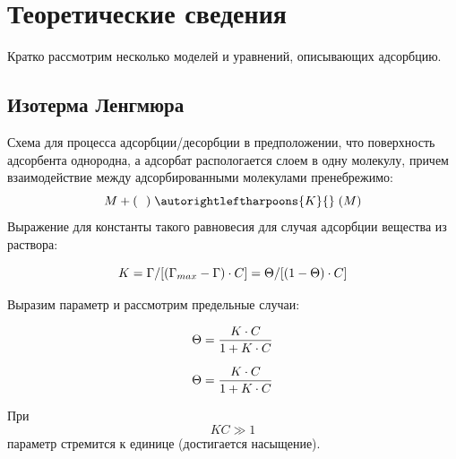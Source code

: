 \documentclass[a4paper]{article}
\begin{document}
	\section{\LARGE \textbf{Теоретические сведения}}
Кратко рассмотрим несколько моделей и уравнений, описывающих адсорбцию. \par
\subsection{\large{Изотерма Ленгмюра}} \par
Схема для процесса адсорбции/десорбции в предположении, что поверхность адсорбента однородна, а адсорбат распологается слоем в одну молекулу, причем взаимодействие между адсорбированными молекулами пренебрежимо:
\LARGE \[ M + (\ \ ) \;\autorightleftharpoons{K}{}\; (M)\]
\large Выражение для константы такого равновесия для случая адсорбции вещества из раствора: \par \vspace{0.3 cm}

\begin{center}
\[

\LARGE K = \Gamma /[(\Gamma_{max} - \Gamma) \cdot C] = \Theta / [(1 - \Theta) \cdot C]


\]
\end{center}

\par 
\vspace{0.3 cm}

Выразим параметр и рассмотрим предельные случаи:

\par 
\vspace{0.3 cm}

\begin{center}
\[

\LARGE \Theta = \frac{K \cdot C}{1 + K \cdot C}


\]
\end{center}

\par 
\vspace{0.3 cm}

\begin{center}
\[

\LARGE \Theta = \frac{K \cdot C}{1 + K \cdot C}


\]
\end{center}

При \[ K C \gg 1 \] параметр стремится к единице (достигается насыщение).
\par \vspace{0.3 cm}
\end{document}
